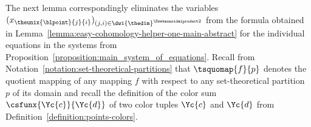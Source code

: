 \documentclass[pdftex]{sigma}
\numberwithin{equation}{section}
\begin{document}
{
  \newcommand{\indi}{i}
  \newcommand{\indj}{j}
  \newcommand{\themap}{f}
  \newcommand{\thepartition}{p}
  \newcommand{\incol}{\Yc{c}}
  \newcommand{\outcol}{\Yc{d}}
  \newcommand{\theelim}{(x_{\theunix{\blpoint}{\indj}{\indi}})_{(\indj,\indi)\in\dwi{\thedim}^{\Ssetmonoidalproduct 2}}}
  The next lemma correspondingly eliminates the variables $\theelim$ from the formula obtained in Lem\-ma~\ref{lemma:easy-cohomology-helper-one-main-abstract} for the individual equations in the systems from Pro\-po\-si\-tion~\ref{proposition:main_system_of_equations}. Recall from Notation~\ref{notation:set-theoretical-partitions} that  $\tsquomap{\themap}{\thepartition}$ denotes the quotient mapping of any mapping $\themap$ with respect to any set-theoretical partition $\thepartition$ of its domain and recall the definition of the color sum $\csfunx{\incol}{\outcol}$ of two color tuples $\incol$ and $\outcol$ from  Definition~\ref{definition:points-colors}.
}
\end{document}
